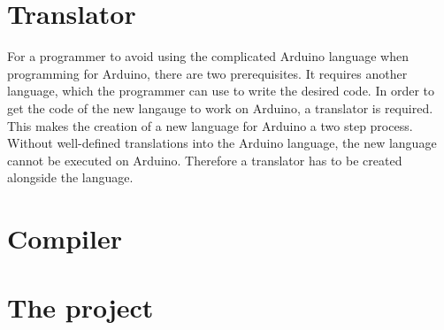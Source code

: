 \section{Translator}
For a programmer to avoid using the complicated Arduino language when programming for Arduino, there are two prerequisites. It requires another language, which the programmer can use to write the desired code. In order to get the code of the new langauge to work on Arduino, a translator is required. This makes the creation of a new language for Arduino a two step process. Without well-defined translations into the Arduino language, the new language cannot be executed on Arduino. Therefore a translator has to be created alongside the language.

\section{Compiler}

\section{The project}